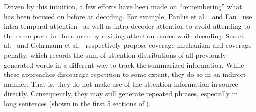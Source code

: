Driven by this intuition, a few efforts have been made on ``remembering''
what has been focused on before at decoding. 
For example, 
Paulus et al.~ and 
Fan~ use intra-temporal 
attention~\cite{NallapatiZSGX16} as well as intra-decoder attention to avoid
attending to the same parts in the source by 
revising attention scores while decoding. 
See et al.~ and Gehrmann et al.~
respectively propose coverage mechanism and coverage penalty,
which records the sum of attention distributions of all previously generated words 
in a different way to track the summarized information.  
While these approaches discourage repetition to some extent,
they do so in an indirect manner. That is, they do not 
make use of the attention information in source directly.
Consequently, they may still generate repeated phrases, 
especially in long sentences (shown in the first 5 sections of
).


